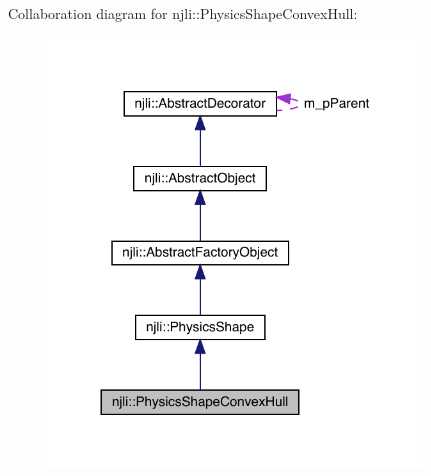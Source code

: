 Collaboration diagram for njli\+:\+:Physics\+Shape\+Convex\+Hull\+:\nopagebreak
\begin{figure}[H]
\begin{center}
\leavevmode
\includegraphics[width=281pt]{classnjli_1_1_physics_shape_convex_hull__coll__graph}
\end{center}
\end{figure}
